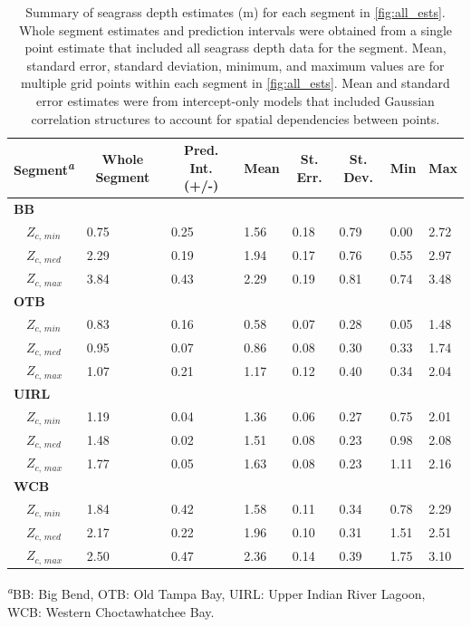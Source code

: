 \documentclass[letterpaper,12pt,oneside]{article}\usepackage[]{graphicx}\usepackage[]{color}
\begin{document}
\begin{table}[!tbp]
\caption{Summary of seagrass depth estimates (m) for each segment in \cref{fig:all_ests}.  Whole segment estimates and prediction intervals were obtained from a single point estimate that included all seagrass depth data for the segment. Mean, standard error, standard deviation, minimum, and maximum values are for multiple grid points within each segment in \cref{fig:all_ests}.  Mean and standard error estimates were from intercept-only models that included Gaussian correlation structures to account for spatial dependencies between points.\label{tab:est_summ}} 
\begin{center}
\begin{tabular}{llllllll}
\hline\hline
\multicolumn{1}{l}{{\bf Segment\textsuperscript{\textit{a}}}}&\multicolumn{1}{c}{Whole Segment}&\multicolumn{1}{c}{Pred. Int. (+/-)}&\multicolumn{1}{c}{Mean}&\multicolumn{1}{c}{St. Err.}&\multicolumn{1}{c}{St. Dev.}&\multicolumn{1}{c}{Min}&\multicolumn{1}{c}{Max}\tabularnewline
\hline
{\bfseries BB}&&&&&&&\tabularnewline
~~$Z_{c,\,min}$&0.75&0.25&1.56&0.18&0.79&0.00&2.72\tabularnewline
~~$Z_{c,\,med}$&2.29&0.19&1.94&0.17&0.76&0.55&2.97\tabularnewline
~~$Z_{c,\,max}$&3.84&0.43&2.29&0.19&0.81&0.74&3.48\tabularnewline
\hline
{\bfseries OTB}&&&&&&&\tabularnewline
~~$Z_{c,\,min}$&0.83&0.16&0.58&0.07&0.28&0.05&1.48\tabularnewline
~~$Z_{c,\,med}$&0.95&0.07&0.86&0.08&0.30&0.33&1.74\tabularnewline
~~$Z_{c,\,max}$&1.07&0.21&1.17&0.12&0.40&0.34&2.04\tabularnewline
\hline
{\bfseries UIRL}&&&&&&&\tabularnewline
~~$Z_{c,\,min}$&1.19&0.04&1.36&0.06&0.27&0.75&2.01\tabularnewline
~~$Z_{c,\,med}$&1.48&0.02&1.51&0.08&0.23&0.98&2.08\tabularnewline
~~$Z_{c,\,max}$&1.77&0.05&1.63&0.08&0.23&1.11&2.16\tabularnewline
\hline
{\bfseries WCB}&&&&&&&\tabularnewline
~~$Z_{c,\,min}$&1.84&0.42&1.58&0.11&0.34&0.78&2.29\tabularnewline
~~$Z_{c,\,med}$&2.17&0.22&1.96&0.10&0.31&1.51&2.51\tabularnewline
~~$Z_{c,\,max}$&2.50&0.47&2.36&0.14&0.39&1.75&3.10\tabularnewline
\hline
\end{tabular}\end{center}
\textsuperscript{\textit{a}}\footnotesize BB: Big Bend, OTB: Old Tampa Bay, UIRL: Upper Indian River Lagoon, WCB: Western Choctawhatchee Bay.\end{table}
\end{document}
